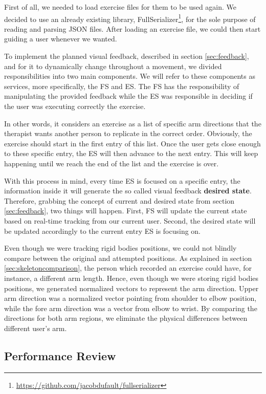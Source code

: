 First of all, we needed to load exercise files for them to be used again. 
We decided to use an already existing library, FullSerializer\footnote{\url{https://github.com/jacobdufault/fullserializer}}, for the sole purpose of reading and parsing JSON files.
After loading an exercise file, we could then start guiding a user whenever we wanted.

To implement the planned visual feedback, described in section \ref{sec:feedback}, and for it to dynamically change throughout a movement, 
we divided responsibilities into two main components. We will refer to these components as services, more specifically, the \ac{FS} and \ac{ES}.
The \ac{FS} has the responsibility of manipulating the provided feedback while the \ac{ES} was responsible in deciding if the user was executing correctly the exercise.

In other words, it considers an exercise as a list of specific arm directions that the therapist wants another person to replicate in the correct order. 
Obviously, the exercise should start in the first entry of this list. 
Once the user gets close enough to these specific entry, the \ac{ES} will then advance to the next entry. 
This will keep happening until we reach the end of the list and the exercise is over.

With this process in mind, every time \ac{ES} is focused on a specific entry, the information inside it will generate the so called visual feedback \textbf{desired state}. 
Therefore, grabbing the concept of current and desired state from section \ref{sec:feedback}, two things will happen. 
First, \ac{FS} will update the current state based on real-time tracking from our current user. 
Second, the desired state will be updated accordingly to the current entry \ac{ES} is focusing on.

Even though we were tracking rigid bodies positions, we could not blindly compare between the original and attempted positions.
As explained in section \ref{sec:skeletoncomparison}, the person which recorded an exercise could have, for instance, a different arm length. Hence, even though we were storing rigid bodies positions, we generated normalized vectors to represent the arm direction. 
Upper arm direction was a normalized vector pointing from shoulder to elbow position, while the fore arm direction was a vector from elbow to wrist.
By comparing the directions for both arm regions, we eliminate the physical differences between different user's arm.

\subsection{Performance Review}

